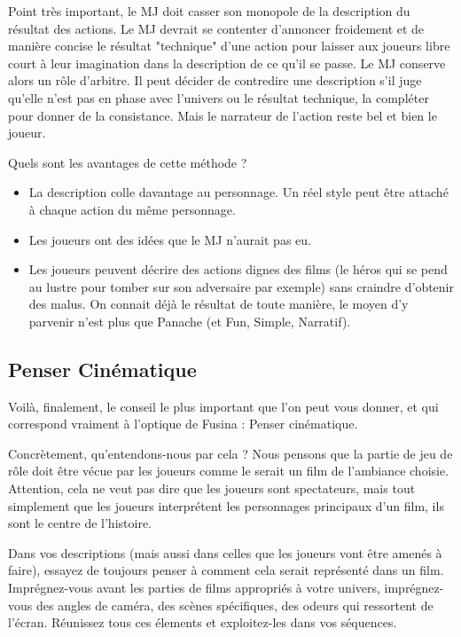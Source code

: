 \begin{multicols}{2}
Point très important, le MJ doit casser son monopole de la description du résultat des actions. Le MJ devrait se contenter d'annoncer froidement et de manière concise le résultat "technique" d'une action pour laisser aux joueurs libre court à leur imagination dans la description de ce qu'il se passe. Le MJ conserve alors un rôle d'arbitre. Il peut décider de contredire une description s'il juge qu'elle n'est pas en phase avec l'univers ou le résultat technique, la compléter pour donner de la consistance. Mais le narrateur de l'action reste bel et bien le joueur.

Quels sont les avantages de cette méthode ?

\begin{itemize}
\item La description colle davantage au personnage. Un réel style peut être attaché à chaque action du même personnage.
\item Les joueurs ont des idées que le MJ n'aurait pas eu.
\item Les joueurs peuvent décrire des actions dignes des films (le héros qui se pend au lustre pour tomber sur son adversaire par exemple) sans craindre d'obtenir des malus. On connait déjà le résultat de toute manière, le moyen d'y parvenir n'est plus que Panache (et Fun, Simple, Narratif).
\end{itemize}

\subsection{Penser Cinématique}

Voilà, finalement, le conseil le plus important que l'on peut vous donner, et qui correspond vraiment à l'optique de Fusina : Penser cinématique.

Concrètement, qu'entendons-nous par cela ? Nous pensons que la partie de jeu de rôle doit être vécue par les joueurs comme le serait un film de l'ambiance choisie. Attention, cela ne veut pas dire que les joueurs sont spectateurs, mais tout simplement que les joueurs interprétent les personnages principaux d'un film, ils sont le centre de l'histoire. 

Dans vos descriptions (mais aussi dans celles que les joueurs vont être amenés à faire), essayez de toujours penser à comment cela serait représenté dans un film. Imprégnez-vous avant les parties de films appropriés à votre univers, imprégnez-vous des angles de caméra, des scènes spécifiques, des odeurs qui ressortent de l'écran. Réunissez tous ces élements et exploitez-les dans vos séquences.


\end{multicols}
